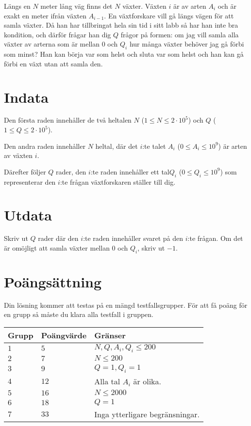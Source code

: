 Längs en $N$ meter lång väg finns det $N$ växter. Växten $i$ är av arten $A_i$ och är exakt en meter ifrån växten $A_{i-1}$. En växtforskare vill gå längs vägen för att samla växter. Då han har tillbringat hela sin tid i sitt labb så har han inte bra kondition,
och därför frågar han dig $Q$ frågor på formen: om jag vill samla alla växter av arterna som är mellan $0$ och $Q_i$ hur många växter behöver jag gå förbi som minst? 
Han kan börja var som helst och sluta var som helst och han kan gå förbi en växt utan att samla den.

\section*{Indata}
Den första raden innehåller de två heltalen $N$ ($1\leq N \leq 2 \cdot 10^5$) och $Q$ ($1 \leq Q \leq 2 \cdot 10^5$).

Den andra raden innehåller $N$ heltal, där det $i$:te talet $A_i$ ($0\le A_i \le 10^9$) är arten av växten $i$.

Därefter följer $Q$ rader, den $i$:te raden innehåller ett tal$Q_i$ ($0 \leq Q_i \leq 10^9$) som representerar den $i$:te frågan växtforskaren ställer till dig.

\section*{Utdata}
Skriv ut $Q$ rader där den $i$:te raden innehåller svaret på den $i$:te frågan. Om det är omöjligt att samla växter mellan $0$ och $Q_i$, skriv ut $-1$.

\section*{Poängsättning}
Din lösning kommer att testas på en mängd testfallsgrupper.
För att få poäng för en grupp så måste du klara alla testfall i gruppen.

\noindent
\begin{tabular}{| l | l | p{12cm} |}
  \hline
  Grupp & Poängvärde & Gränser \\ \hline
  $1$   & $5$       & $N, Q, A_i, Q_i \leq 200 $\\ \hline
  $2$   & $7$       & $N \leq 200 $\\ \hline
  $3$   & $9$       & $Q=1, Q_i=1$\\ \hline
  $4$   & $12$       & Alla tal $A_i$ är olika. \\ \hline
  $5$   & $16$       & $N \leq 2000 $  \\ \hline
  $6$   & $18$       & $Q = 1$ \\ \hline
  $7$   & $33$       & Inga ytterligare begränsningar. \\ \hline
\end{tabular}

